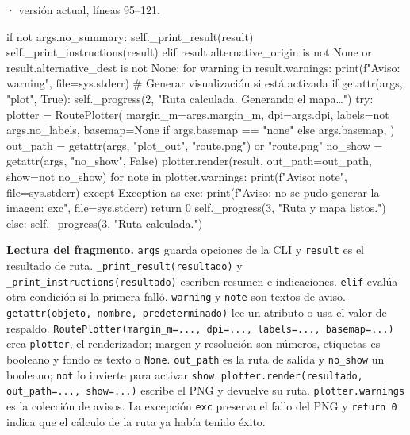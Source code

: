 \documentclass[11pt,a4paper]{article}
\begin{document}
\smallskip
{\footnotesize\texttt{} · versión actual, líneas 95--121.}\par
\begin{Codigo}[firstnumber=95]
        if not args.no_summary:
            self._print_result(result)
            self._print_instructions(result)
        elif result.alternative_origin is not None or result.alternative_dest is not None:
            for warning in result.warnings:
                print(f"Aviso: {warning}", file=sys.stderr)
        # Generar visualización si está activada
        if getattr(args, "plot", True):
            self._progress(2, "Ruta calculada. Generando el mapa…")
            try:
                plotter = RoutePlotter(
                    margin_m=args.margin_m,
                    dpi=args.dpi,
                    labels=not args.no_labels,
                    basemap=None if args.basemap == "none" else args.basemap,
                )
                out_path = getattr(args, "plot_out", "route.png") or "route.png"
                no_show = getattr(args, "no_show", False)
                plotter.render(result, out_path=out_path, show=not no_show)
                for note in plotter.warnings:
                    print(f"Aviso: {note}", file=sys.stderr)
            except Exception as exc:
                print(f"Aviso: no se pudo generar la imagen: {exc}", file=sys.stderr)
                return 0
            self._progress(3, "Ruta y mapa listos.")
        else:
            self._progress(3, "Ruta calculada.")
\end{Codigo}

\textbf{Lectura del fragmento.} \texttt{args} guarda opciones de la CLI y \texttt{result} es el resultado de ruta. \texttt{\_print\_result(resultado)} y \texttt{\_print\_instructions(resultado)} escriben resumen e indicaciones. \texttt{elif} evalúa otra condición si la primera falló. \texttt{warning} y \texttt{note} son textos de aviso. \texttt{getattr(objeto, nombre, predeterminado)} lee un atributo o usa el valor de respaldo. \texttt{RoutePlotter(margin\_m=..., dpi=..., labels=..., basemap=...)} crea \texttt{plotter}, el renderizador; margen y resolución son números, etiquetas es booleano y fondo es texto o \texttt{None}. \texttt{out\_path} es la ruta de salida y \texttt{no\_show} un booleano; \texttt{not} lo invierte para activar \texttt{show}. \texttt{plotter.render(resultado, out\_path=..., show=...)} escribe el PNG y devuelve su ruta. \texttt{plotter.warnings} es la colección de avisos. La excepción \texttt{exc} preserva el fallo del PNG y \texttt{return 0} indica que el cálculo de la ruta ya había tenido éxito.
\end{document}
